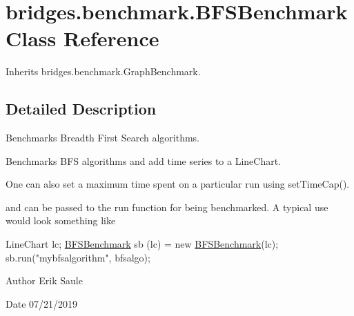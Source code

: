 \hypertarget{classbridges_1_1benchmark_1_1_b_f_s_benchmark}{}\section{bridges.\+benchmark.\+B\+F\+S\+Benchmark Class Reference}
\label{classbridges_1_1benchmark_1_1_b_f_s_benchmark}


Inherits bridges.\+benchmark.\+Graph\+Benchmark.



\subsection{Detailed Description}
Benchmarks Breadth First Search algorithms. 

Benchmarks B\+FS algorithms and add time series to a Line\+Chart.

One can also set a maximum time spent on a particular run using set\+Time\+Cap().

and can be passed to the run function for being benchmarked. A typical use would look something like


\begin{DoxyCode}
LineChart lc;
\mbox{\hyperlink{classbridges_1_1benchmark_1_1_b_f_s_benchmark_a47647a605d5cd6523e1472191e12ab94}{BFSBenchmark}} sb (lc) = \textcolor{keyword}{new} \mbox{\hyperlink{classbridges_1_1benchmark_1_1_b_f_s_benchmark_a47647a605d5cd6523e1472191e12ab94}{BFSBenchmark}}(lc);
sb.run(\textcolor{stringliteral}{"mybfsalgorithm"}, bfsalgo);
\end{DoxyCode}


\begin{DoxyAuthor}{Author}
Erik Saule 
\end{DoxyAuthor}
\begin{DoxyDate}{Date}
07/21/2019 
\end{DoxyDate}
